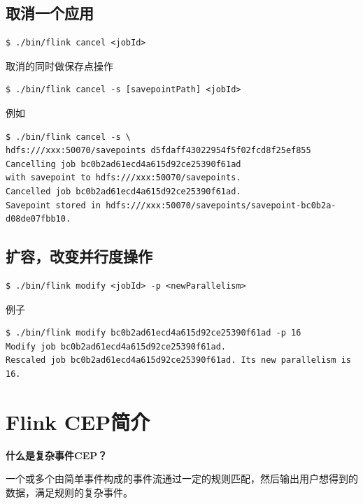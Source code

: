 \documentclass[cn,11pt,chinese]{elegantbook}
\begin{document}
\section{取消一个应用}

\begin{verbatim}
$ ./bin/flink cancel <jobId>
\end{verbatim}

取消的同时做保存点操作

\begin{verbatim}
$ ./bin/flink cancel -s [savepointPath] <jobId>
\end{verbatim}

例如

\begin{verbatim}
$ ./bin/flink cancel -s \
hdfs:///xxx:50070/savepoints d5fdaff43022954f5f02fcd8f25ef855
Cancelling job bc0b2ad61ecd4a615d92ce25390f61ad 
with savepoint to hdfs:///xxx:50070/savepoints.
Cancelled job bc0b2ad61ecd4a615d92ce25390f61ad. 
Savepoint stored in hdfs:///xxx:50070/savepoints/savepoint-bc0b2a-d08de07fbb10.
\end{verbatim}

\section{扩容，改变并行度操作}

\begin{verbatim}
$ ./bin/flink modify <jobId> -p <newParallelism>
\end{verbatim}

例子

\begin{verbatim}
$ ./bin/flink modify bc0b2ad61ecd4a615d92ce25390f61ad -p 16
Modify job bc0b2ad61ecd4a615d92ce25390f61ad.
​Rescaled job bc0b2ad61ecd4a615d92ce25390f61ad. Its new parallelism is 16.
\end{verbatim}

\chapter{Flink CEP简介}

\textbf{什么是复杂事件CEP？}

一个或多个由简单事件构成的事件流通过一定的规则匹配，然后输出用户想得到的数据，满足规则的复杂事件。
\end{document}
